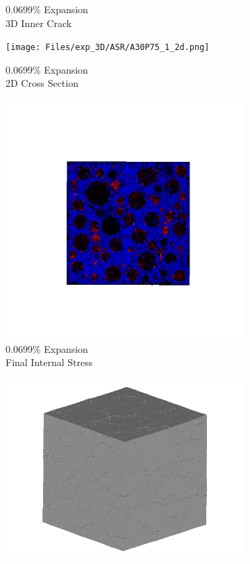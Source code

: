 \begin{figure}[ht!]
\begin{subfigure}{.25\textwidth}
      \caption{0.0699\% Expansion\\3D Inner Crack}
    \end{subfigure}%
    \begin{subfigure}{.25\textwidth}
      \centering
      \texttt{[image: Files/exp\_3D/ASR/A30P75\_1\_2d.png]}
      \caption{0.0699\% Expansion\\2D Cross Section}
    \end{subfigure}%
    \begin{subfigure}{.25\textwidth}
      \centering
      \includegraphics[width=.8\linewidth]{Files/exp_3D/ASR/A30P75_1_stress.png}
      \caption{0.0699\% Expansion\\Final Internal Stress}
    \end{subfigure}
    \begin{subfigure}{.25\textwidth}
      \centering
      \includegraphics[width=.8\linewidth]{Files/exp_3D/ASR/A30P75_2_3d.png}

\end{subfigure}
\end{figure}

